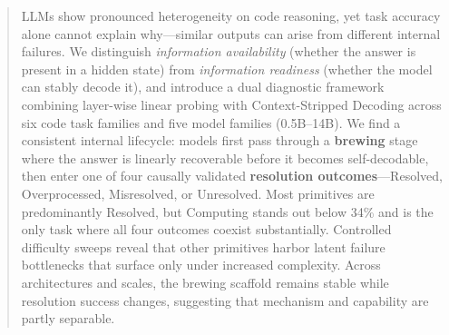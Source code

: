 \begin{abstract}

LLMs show pronounced heterogeneity on code reasoning, yet task accuracy alone cannot explain why---similar outputs can arise from different internal failures. We distinguish \textit{information availability} (whether the answer is present in a hidden state) from \textit{information readiness} (whether the model can stably decode it), and introduce a dual diagnostic framework combining layer-wise linear probing with Context-Stripped Decoding across six code task families and five model families (0.5B--14B). We find a consistent internal lifecycle: models first pass through a \textbf{brewing} stage where the answer is linearly recoverable before it becomes self-decodable, then enter one of four causally validated \textbf{resolution outcomes}---Resolved, Overprocessed, Misresolved, or Unresolved. Most primitives are predominantly Resolved, but Computing stands out below 34\% and is the only task where all four outcomes coexist substantially. Controlled difficulty sweeps reveal that other primitives harbor latent failure bottlenecks that surface only under increased complexity. Across architectures and scales, the brewing scaffold remains stable while resolution success changes, suggesting that mechanism and capability are partly separable.
\end{abstract}
